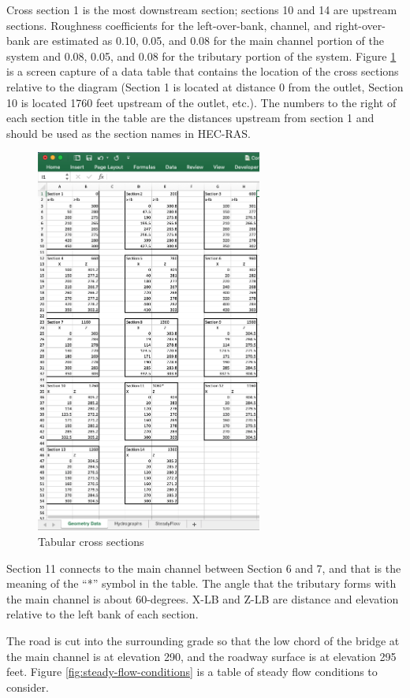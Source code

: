 Cross section 1 is the most downstream section; sections 10 and 14 are upstream sections.  
Roughness coefficients for the left-over-bank, channel, and right-over-bank are estimated as 0.10, 0.05, and 0.08 for the main channel portion of the system and 0.08, 0.05, and 0.08 for the tributary portion of the system.
\clearpage
Figure \ref{fig:cross-sections-table} is a screen capture of a data table that contains the location of the cross sections relative to the diagram (Section 1 is located at distance 0 from the outlet, Section 10 is located 1760 feet upstream of the outlet, etc.).  
The numbers to the right of each section title in the table are the distances upstream from section 1 and should be used as the section names in HEC-RAS.   
\begin{figure}[h!] %
   \centering
   \includegraphics[height=5in]{cross-sections-table.png} 
   \caption{Tabular cross sections }
   \label{fig:cross-sections-table}
\end{figure}
Section 11 connects to the main channel between Section 6 and 7, and that is the meaning of the ``*'' symbol in the table.
The angle that the tributary forms with the main channel is about 60-degrees.
X-LB and Z-LB are distance and elevation relative to the left bank of each section. %

The road is cut into the surrounding grade so that the low chord of the bridge at the main channel is at elevation 290, and the roadway surface is at elevation 295 feet.  
\clearpage
Figure \ref{fig:steady-flow-conditions} is a table of steady flow conditions to consider. 

